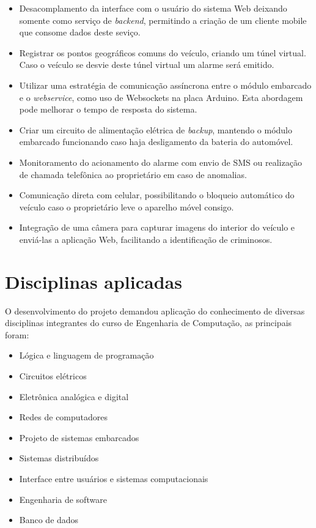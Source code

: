 \begin{itemize}
	\item Desacomplamento da interface com o usuário do sistema Web deixando somente como serviço de \textit{backend}, permitindo a criação de um cliente mobile que consome dados deste seviço.
	\item Registrar os pontos geográficos comuns do veículo, criando um túnel virtual. Caso o veículo se desvie deste túnel virtual um alarme será emitido.
	\item Utilizar uma estratégia de comunicação assíncrona entre o módulo embarcado e o \textit{webservice}, como uso de Websockets na placa Arduino. Esta abordagem pode melhorar o tempo de resposta do sistema.
	\item Criar um circuito de alimentação elétrica de \textit{backup}, mantendo o módulo embarcado funcionando caso haja desligamento da bateria do automóvel.
	\item Monitoramento do acionamento do alarme com envio de SMS ou realização de chamada telefônica ao proprietário em caso de anomalias.
	\item Comunicação direta com celular, possibilitando o bloqueio automático do veículo caso o proprietário leve o aparelho móvel consigo. 
	\item Integração de uma câmera para capturar imagens do interior do veículo e enviá-las a aplicação Web, facilitando a identificação de criminosos.
\end{itemize}

\section{Disciplinas aplicadas}

O desenvolvimento do projeto demandou aplicação do conhecimento de diversas disciplinas integrantes do curso de Engenharia de Computação, as principais foram:

\begin{itemize}
	\item Lógica e linguagem de programação
	\item Circuitos elétricos
	\item Eletrônica analógica e digital
	\item Redes de computadores
	\item Projeto de sistemas embarcados
	\item Sistemas distribuídos
	\item Interface entre usuários e sistemas computacionais
	\item Engenharia de software
	\item Banco de dados
\end{itemize}